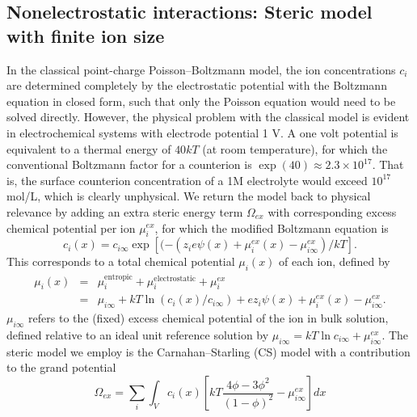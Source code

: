 \subsection{Nonelectrostatic interactions: Steric model with  finite ion size}

 In the classical point-charge Poisson--Boltzmann model, the
ion concentrations $c_i$ are determined completely by the
electrostatic potential with the Boltzmann equation in closed form,
such that
only the Poisson equation would need to be solved directly. However, the
physical problem with the classical model is evident in electrochemical
systems with electrode potential 1 V. A one volt potential is
equivalent to a thermal energy of $40 kT$ (at room temperature), for which the conventional
Boltzmann factor for a counterion is
$\exp(40)\approx 2.3 \times 10^{17}$.  That is, the surface counterion
concentration of a 1M electrolyte would exceed $10^{17}$ mol/L, which
is clearly unphysical.  We return the model back to physical
relevance by adding an extra steric energy term $\Omega_{ex}$ with
corresponding excess chemical potential per ion $\mu_{i}^{ex}$, for
which the modified Boltzmann equation is
\begin{equation}
    c_i(x)=c_{i\infty}\exp\left[(-(z_i e \psi(x) + \mu_i^{ex}(x)-\mu_{i\infty}^{ex})/kT\right].
    \label{general_Boltzmann}
\end{equation}
This corresponds to a total chemical potential $\mu_i(x)$ of each ion,
defined by
\begin{eqnarray}
  \mu_i(x) &=& \mu_{i}^{\textrm{entropic}} +  \mu_{i}^{\textrm{electrostatic}} +
               \mu_{i}^{ex} \\
{} &  =&\mu_{i\infty} + kT \ln(c_i(x)/c_{i\infty})
         + ez_i \psi(x) + \mu_i^{ex}(x)-\mu_{i\infty}^{ex}.
         \label{chem_pot}
\end{eqnarray}
$\mu_{i\infty}$ refers to the (fixed) excess chemical potential of the
ion in bulk solution, defined relative to an ideal unit
reference solution by $\mu_{i\infty} = kT\ln c_{i\infty} + \mu_{i\infty}^{ex}$.
The steric model we employ is the Carnahan--Starling (CS) model
\citep{CarnahanStarling1969} with a contribution to the grand potential
\begin{equation}
    \Omega_{ex} = \sum_{i} \int_{V} c_{i}(x) \left[ kT
    \frac{4\phi - 3\phi^2}{(1-\phi)^2}
    -  \mu_{i\infty}^{ex}
  \right]dx
  \label{CS_energy_functional}
\end{equation}
